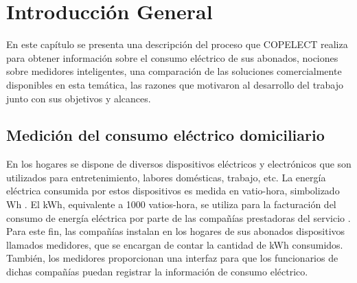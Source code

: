 
\chapter{Introducción General} %

\label{Chapter1} %
\label{IntroGeneral}


\newcommand{\keyword}[1]{\textbf{#1}}
\newcommand{\tabhead}[1]{\textbf{#1}}
\newcommand{\code}[1]{\texttt{#1}}
\newcommand{\file}[1]{\texttt{\bfseries#1}}
\newcommand{\option}[1]{\texttt{\itshape#1}}
\newcommand{\grados}{$^{\circ}$}



En este capítulo se presenta una descripción del proceso que COPELECT realiza para obtener información sobre el consumo eléctrico de sus abonados, nociones sobre medidores inteligentes, una comparación de las soluciones comercialmente disponibles en esta temática, las razones que motivaron al desarrollo del trabajo junto con sus objetivos y alcances.


\section{Medición del consumo eléctrico domiciliario}

En los hogares se dispone de diversos dispositivos eléctricos y electrónicos que son utilizados para entretenimiento, labores domésticas, trabajo, etc. La energía eléctrica consumida por estos dispositivos es medida en vatio-hora, simbolizado Wh \citep{WEBSITE:1}. El kWh, equivalente a 1000 vatios-hora, se utiliza para la facturación del consumo de energía eléctrica por parte de las compañías prestadoras del servicio \citep{WEBSITE:1}. Para este fin, las compañías instalan en los hogares de sus abonados dispositivos llamados medidores, que se encargan de contar la cantidad de kWh consumidos. También, los medidores proporcionan una interfaz para que los funcionarios de dichas compañías puedan registrar la información de consumo eléctrico.


